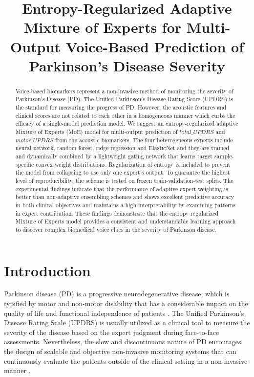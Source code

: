 \documentclass{customIEEEsingle}
\title{Entropy-Regularized Adaptive Mixture of Experts for Multi-Output Voice-Based Prediction of Parkinson’s Disease Severity}
\affiliation{Department of CSE (AI \& ML), Narula Institute of Technology, Kolkata, India}
\begin{document}
	\maketitle
	
	\begin{abstract}
		Voice-based biomarkers represent a non-invasive method of monitoring the severity of Parkinson’s Disease (PD). The Unified Parkinson’s Disease Rating Score (UPDRS) is the standard for measuring the progress of PD. However, the acoustic features and clinical scores are not related to each other in a homogeneous manner which curbs the efficacy of a single-model prediction model. We suggest an entropy-regularized adaptive Mixture of Experts (MoE) model for multi-output prediction of $total\_UPDRS$ and $motor\_UPDRS$ from the acoustic biomarkers. The four heterogeneous experts include neural network, random forest, ridge regression and ElasticNet and they are trained and dynamically combined by a lightweight gating network that learns target sample-specific convex weight distributions. Regularization of entropy is included to prevent the model from collapsing to use only one expert’s output. To guarantee the highest level of reproducibility, the scheme is tested on frozen train-validation-test splits. The experimental findings indicate that the performance of adaptive expert weighting is better than non-adaptive ensembling schemes and shows excellent predictive accuracy in both clinical objectives and maintains a high interpretability by examining patterns in expert contribution. These findings demonstrate that the entropy regularized Mixture of Experts model provides a consistent and understandable learning approach to discover complex biomedical voice clues in the severity of Parkinson disease.
	\end{abstract}
	
	
	\newpage
	\section{Introduction} \label{sec:introduction}
	
		Parkinson disease (PD) is a progressive neurodegenerative disease, which is typified by motor and non-motor disability that has a considerable impact on the quality of life and functional independence of patients \cite{maetzler-2009}. The Unified Parkinson's Disease Rating Scale (UPDRS) is usually utilized as a clinical tool to measure the severity of the disease based on the expert judgment during face-to-face assessments. Nevertheless, the slow and discontinuous nature of PD encourages the design of scalable and objective non-invasive monitoring systems that can continuously evaluate the patients outside of the clinical setting in a non-invasive manner \cite{tsanas-2009, tracy-2019}. 
		
\end{document}
